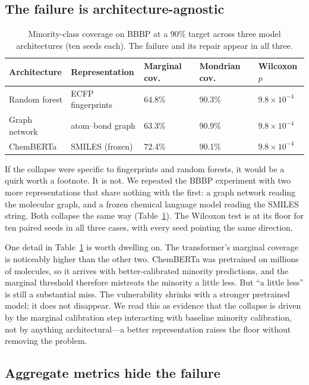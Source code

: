 \documentclass[11pt]{article}
\begin{document}
\subsection{The failure is architecture-agnostic}

\begin{table}[h]
\centering
\caption{Minority-class coverage on BBBP at a 90\% target across three model architectures (ten
seeds each). The failure and its repair appear in all three.}
\label{tab:table4}
\begin{tabular}{lllll}
\toprule
Architecture & Representation & Marginal cov.\ & Mondrian cov.\ & Wilcoxon $p$ \\
\midrule
Random forest & ECFP fingerprints & 64.8\% & 90.3\% & $9.8\times 10^{-4}$ \\
Graph network & atom--bond graph & 63.3\% & 90.9\% & $9.8\times 10^{-4}$ \\
ChemBERTa & SMILES (frozen) & 72.4\% & 90.1\% & $9.8\times 10^{-4}$ \\
\bottomrule
\end{tabular}
\end{table}

If the collapse were specific to fingerprints and random forests, it would be a quirk worth a
footnote. It is not. We repeated the BBBP experiment with two more representations that share
nothing with the first: a graph network reading the molecular graph, and a frozen chemical language
model reading the SMILES string. Both collapse the same way (Table~\ref{tab:table4}). The Wilcoxon
test is at its floor for ten paired seeds in all three cases, with every seed pointing the same
direction.

One detail in Table~\ref{tab:table4} is worth dwelling on. The transformer's marginal coverage is
noticeably higher than the other two. ChemBERTa was pretrained on millions of molecules, so it
arrives with better-calibrated minority predictions, and the marginal threshold therefore mistreats
the minority a little less. But ``a little less'' is still a substantial miss. The vulnerability
shrinks with a stronger pretrained model; it does not disappear. We read this as evidence that the
collapse is driven by the marginal calibration step interacting with baseline minority calibration,
not by anything architectural---a better representation raises the floor without removing the
problem.

\subsection{Aggregate metrics hide the failure}
\end{document}
